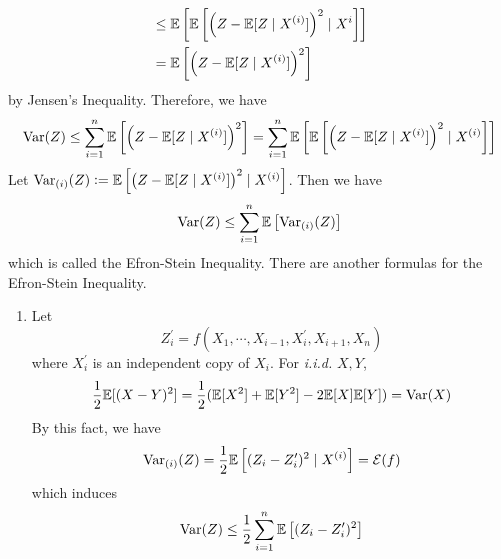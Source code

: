 \begin{enumerate}[label=\arabic{*}.]
\begin{equation*}
\begin{aligned}
	    	&\leq \mathbb{E}\left[\mathbb{E}\left[\left(Z - \mathbb{E}[Z \mid X^{(i)}]\right)^2 \mid X^i\right]\right] \\
	    	&= \mathbb{E}\left[\left(Z - \mathbb{E}[Z \mid X^{(i)}]\right)^2\right]
	    \end{aligned}
	\end{equation*}
	by Jensen's Inequality. Therefore, we have
	\begin{equation*}
	     \operatorname{Var}(Z) \leq \sum_{i=1}^n \mathbb{E}\left[\left(Z - \mathbb{E}[Z \mid X^{(i)}]\right)^2\right] =  \sum_{i=1}^n \mathbb{E}\left[\mathbb{E}\left[\left(Z - \mathbb{E}[Z \mid X^{(i)}]\right)^2  \mid X^{(i)}\right]\right] 
	\end{equation*}
	Let $\operatorname{Var}_{(i)}(Z) \vcentcolon= \mathbb{E}\left[\left(Z - \mathbb{E}[Z \mid X^{(i)}]\right)^2  \mid X^{(i)}\right]$. Then we have
	\begin{equation*}
	    \operatorname{Var}(Z) \leq \sum_{i=1}^n \mathbb{E}\left[\operatorname{Var}_{(i)}(Z)\right]
	\end{equation*}
	which is called the Efron-Stein Inequality. There are another formulas for the Efron-Stein Inequality.
	\begin{enumerate}[label=(\roman*)]
		\item Let
		\begin{equation*}
		    Z_i^\prime = f(X_1,\cdots,X_{i-1},X_i^\prime,X_{i+1},X_n)
		\end{equation*}
		where $X_i^\prime$ is an independent copy of $X_i$. For \emph{i.i.d.} $X,Y$, 
		\begin{equation*}
		    \begin{aligned}
		    	\frac{1}{2}\mathbb{E}[(X-Y)^2] = \frac{1}{2}(\mathbb{E}[X^2]+\mathbb{E}[Y ^2]-2\mathbb{E}[X]\mathbb{E}[Y]) = \operatorname{Var}(X)
		    \end{aligned}
		\end{equation*}
		By this fact, we have
		\begin{equation*}
		    \operatorname{Var}_{(i)}(Z) = \frac{1}{2}\mathbb{E} \left[(Z_i-Z_i^\prime)^2 \mid X^{(i)}\right] = \mathcal{E}(f)
		\end{equation*}
		which induces 
		\begin{equation*}
		    \operatorname{Var}(Z) \leq \frac{1}{2} \sum_{i=1}^n \mathbb{E}\left[(Z_i-Z_i^\prime)^2\right]
		\end{equation*}


\end{enumerate}
\end{enumerate}
